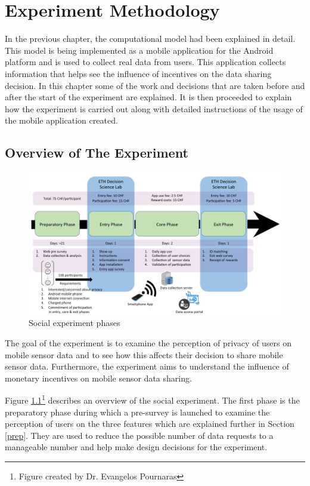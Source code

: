\chapter{Experiment Methodology} \label{exp}

In the previous chapter, the computational model had been explained in detail. This model is being implemented as a mobile application for the Android platform and is used to collect real data from users. This application collects information that helps see the influence of incentives on the data sharing decision. In this chapter some of the work and decisions that are taken before and after the start of the experiment are explained. It is then proceeded to explain how the experiment is carried out along with detailed instructions of the usage of the mobile application created. 

\section{Overview of The Experiment} \label{overview}
\begin{figure}[ht!]
\centering
\includegraphics[width=\textwidth,keepaspectratio]{./images/exp_phases}
\caption{Social experiment phases}
\label{fig:exp_phases}
\end{figure}

The goal of the experiment is to examine the perception of privacy of users on mobile sensor data and to see how this affects their decision to share mobile sensor data. Furthermore, the experiment aims to understand the influence of monetary incentives on mobile sensor data sharing.

Figure \ref{fig:exp_phases}\footnote{Figure created by Dr. Evangelos Pournaras} describes an overview of the social experiment. The first phase is the preparatory phase during which a pre-survey is launched to examine the perception of users on the three features which are explained further in Section \ref{prep}. They are used to reduce the possible number of data requests to a manageable number and help make design decisions for the experiment.

